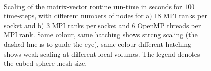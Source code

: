 \documentclass[review,times]{elsarticle}
\begin{document}
\begin{figure}
  \begin{center}
    \\
    \caption{\label{fig:OMP_scale}Scaling of the matrix-vector routine
      run-time in seconds for $100$ time-steps, with different numbers
      of nodes for a) $18$ MPI ranks per socket and b) $3$ MPI ranks
      per socket and $6$ OpenMP threads per MPI rank. Same colour,
      same hatching shows strong scaling (the dashed line is to guide
      the eye), same colour different hatching shows weak scaling at
      different local volumes. The legend denotes the cubed-sphere
      mesh size.}
  \end{center}
\end{figure}
\end{document}
